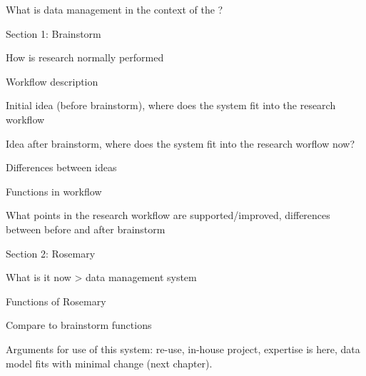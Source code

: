 What is data management in the context of the \ivfsystem{}?


Section 1: Brainstorm

How is research normally performed

Workflow description

Initial idea (before brainstorm), where does the system fit into the research workflow

Idea after brainstorm, where does the system fit into the research worflow now?

Differences between ideas

Functions in workflow

What points in the research workflow are supported/improved, differences between before and after brainstorm

Section 2: Rosemary

What is it now > data management system

Functions of Rosemary

Compare to brainstorm functions

Arguments for use of this system: re-use, in-house project, expertise is here, data model fits with minimal change (next chapter).